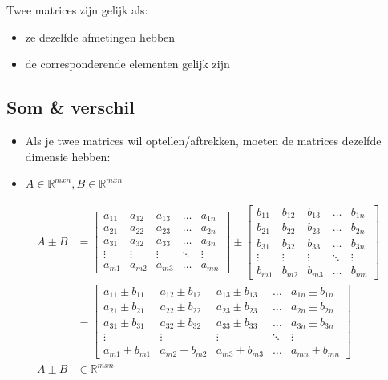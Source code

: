 \documentclass{article}
\begin{document}
Twee matrices zijn gelijk als:

\begin{itemize}
    \item ze dezelfde afmetingen hebben
    \item de corresponderende elementen gelijk zijn
\end{itemize}


\subsection{Som \& verschil}

\begin{itemize}
    \item Als je twee matrices wil optellen/aftrekken, moeten de matrices dezelfde dimensie hebben:
    \item $A \in \mathbb{R}^{mxn}, B \in \mathbb{R}^{mxn}$
\end{itemize}

\begin{align*}
    A \pm B & = 
\begin{bmatrix}
    a_{11} & a_{12} & a_{13} & \dots & a_{1n}\\
    a_{21} & a_{22} & a_{23} & \dots & a_{2n}\\
    a_{31} & a_{32} & a_{33} & \dots & a_{3n}\\
    \vdots & \vdots & \vdots & \ddots & \vdots\\
    a_{m1} & a_{m2} & a_{m3} & \dots & a_{mn}
\end{bmatrix} \pm 
\begin{bmatrix}
    b_{11} & b_{12} & b_{13} & \dots & b_{1n}\\
    b_{21} & b_{22} & b_{23} & \dots & b_{2n}\\
    b_{31} & b_{32} & b_{33} & \dots & b_{3n}\\
    \vdots & \vdots & \vdots & \ddots & \vdots\\
    b_{m1} & b_{m2} & b_{m3} & \dots & b_{mn}
\end{bmatrix} \\
& = \begin{bmatrix}
    a_{11}\pm b_{11} & a_{12}\pm b_{12} & a_{13}\pm b_{13} & \dots & a_{1n}\pm b_{1n}\\
    a_{21}\pm b_{21} & a_{22}\pm b_{22} & a_{23}\pm b_{23} & \dots & a_{2n}\pm b_{2n}\\
    a_{31}\pm b_{31} & a_{32}\pm b_{32} & a_{33}\pm b_{33} & \dots & a_{3n}\pm b_{3n}\\
    \vdots & \vdots & \vdots & \ddots & \vdots\\
    a_{m1}\pm b_{m1} & a_{m2}\pm b_{m2} & a_{m3}\pm b_{m3} & \dots & a_{mn}\pm b_{mn}
\end{bmatrix}\\
A \pm B & \in \mathbb{R}^{mxn}
\end{align*}
\end{document}
